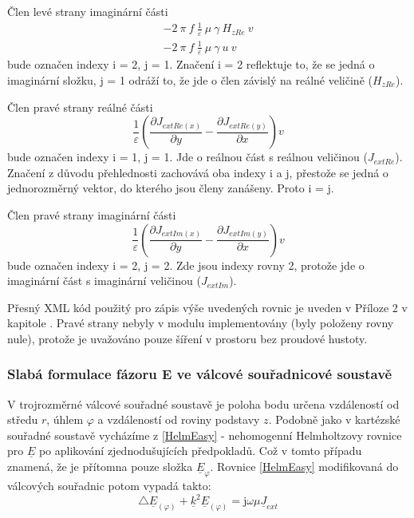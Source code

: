 \documentclass[12pt,a4paper,oneside]{article}
\numberwithin{equation}{section} %
\numberwithin{figure}{section} %
\numberwithin{table}{section} %
\newcommand{\mj}{\mathrm{j}} %
\newcommand{\faz}[1]{{\underline{#1}}} %
\begin{document}
Člen levé strany imaginární části
\begin{subequations}
\begin{gather}
- 2 ~ \pi ~ f ~ \frac{1}{\varepsilon} ~ \mu ~ \gamma ~ H _{zRe} ~ v
\\
- 2 ~ \pi ~ f ~ \frac{1}{\varepsilon} ~ \mu ~ \gamma ~ u ~ v
\end{gather}
\end{subequations}
bude označen indexy i = 2, j = 1. Značení i = 2 reflektuje to, že se jedná o imaginární složku, j = 1 odráží to, že jde o člen závislý na reálné veličině ($H _{zRe}$).

Člen pravé strany reálné části
\begin{equation}
\frac{1}{\varepsilon} \left( \frac{\partial J _{extRe(x)}}{\partial y} - \frac{\partial J _{extRe(y)}}{\partial x} \right) v
\end{equation}
bude označen indexy i = 1, j = 1. Jde o reálnou část s reálnou veličinou ($J _{extRe}$). Značení z důvodu přehlednosti zachovává oba indexy i a j, přestože se jedná o jednorozměrný vektor, do kterého jsou členy zanášeny. Proto i = j.

Člen pravé strany imaginární části
\begin{equation}
\frac{1}{\varepsilon} \left(\frac{\partial J _{extIm(x)}}{\partial y} - \frac{\partial J _{extIm(y)}}{\partial x} \right)  v
\end{equation}
bude označen indexy i = 2, j = 2. Zde jsou indexy rovny 2, protože jde o imaginární část s imaginární veličinou ($J _{extIm}$).

Přesný XML kód použitý pro zápis výše uvedených rovnic je uveden v Příloze 2 v kapitole . Pravé strany nebyly v modulu implementovány (byly položeny rovny nule), protože je uvažováno pouze šíření v prostoru bez proudové hustoty.


\subsubsection{Slabá formulace fázoru E ve válcové souřadnicové soustavě}

V trojrozměrné válcové souřadné soustavě je poloha bodu určena vzdáleností od středu $r$, úhlem $\varphi$ a vzdáleností od roviny podstavy $z$. Podobně jako v kartézské souřadné soustavě vycházíme z \ref{HelmEasy} - nehomogenní Helmholtzovy rovnice pro $\faz{E}$ po aplikování zjednodušujících předpokladů. Což v tomto případu znamená, že je přítomna pouze složka $\faz{E} _{\varphi}$. Rovnice \ref{HelmEasy} modifikovaná do válcových souřadnic potom vypadá takto:
\begin{equation}
\triangle \faz{E} _{(\varphi)} + \faz{k} ^2 \faz{E} _{(\varphi)} = \mj \omega \mu \faz{J} _{ext} 
\end{equation}
\end{document}
